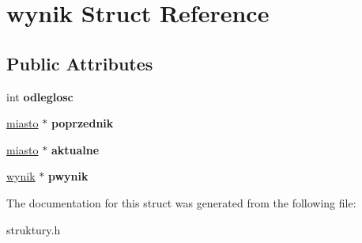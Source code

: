\hypertarget{structwynik}{}\section{wynik Struct Reference}
\label{structwynik}
\subsection*{Public Attributes}
\begin{DoxyCompactItemize}
\item 
\mbox{\label{structwynik_a1d4bdbbeeab7909c75c6625004262deb}} 
int {\bfseries odleglosc}
\item 
\mbox{\label{structwynik_afa7fd8e9bc0c7c08d65b2a34cba6ba4c}} 
\mbox{\hyperlink{structmiasto}{miasto}} $\ast$ {\bfseries poprzednik}
\item 
\mbox{\label{structwynik_a0573b145c21dc690ab831f1da15dff0c}} 
\mbox{\hyperlink{structmiasto}{miasto}} $\ast$ {\bfseries aktualne}
\item 
\mbox{\label{structwynik_a421d42579966b3daeb7b474bf146bf1a}} 
\mbox{\hyperlink{structwynik}{wynik}} $\ast$ {\bfseries pwynik}
\end{DoxyCompactItemize}


The documentation for this struct was generated from the following file\+:\begin{DoxyCompactItemize}
\item 
struktury.\+h\end{DoxyCompactItemize}
